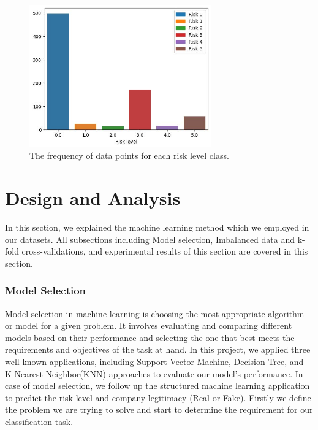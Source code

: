 \documentclass{article}
\begin{document}
\begin{figure}[h]%
\centering
\includegraphics[width=0.7\textwidth]{imbalanced.jpg}
\caption{The frequency of data points for each risk level class.}\label{dist}
\end{figure}



\section{Design and Analysis}

In this section, we explained the machine learning method which we employed in our datasets. All subsections including Model selection, Imbalanced data and k-fold cross-validations, and experimental results of this section are covered in this section. 


\subsubsection{Model Selection}

Model selection in machine learning is choosing the most appropriate algorithm or model for a given problem. It involves evaluating and comparing different models based on their performance and selecting the one that best meets the requirements and objectives of the task at hand. In this project, we applied three well-known applications, including Support Vector Machine, Decision Tree, and K-Nearest Neighbor(KNN) approaches to evaluate our model's performance. In case of model selection, we follow up the structured machine learning application to predict the risk level and company legitimacy (Real or Fake). Firstly we define the problem we are trying to solve and start to determine the requirement for our classification task. 
\end{document}
